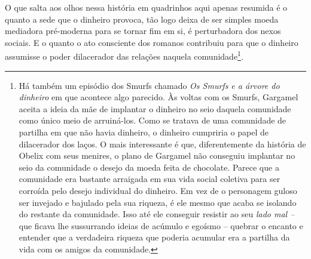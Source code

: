 O que salta aos olhos nessa história em quadrinhos aqui apenas resumida
é o quanto a sede que o dinheiro provoca, tão logo deixa de ser simples
moeda mediadora pré-moderna para se tornar fim em si, é perturbadora dos
nexos sociais. E o quanto o ato consciente dos romanos contribuiu para
que o dinheiro assumisse o poder dilacerador das relações naquela
comunidade\footnote{Há também um episódio dos Smurfs chamado \emph{Os
  Smurfs e a árvore do dinheiro} em que acontece algo parecido. Às
  voltas com os Smurfs, Gargamel aceita a ideia da mãe de implantar o
  dinheiro no seio daquela comunidade como único meio de arruiná-los.
  Como se tratava de uma comunidade de partilha em que não havia
  dinheiro, o dinheiro cumpriria o papel de dilacerador dos laços. O
  mais interessante é que, diferentemente da história de Obelix com seus
  menires, o plano de Gargamel não conseguiu implantar no seio da
  comunidade o desejo da moeda feita de chocolate. Parece que a
  comunidade era bastante arraigada em sua vida social coletiva para ser
  corroída pelo desejo individual do dinheiro. Em vez de o personagem
  guloso ser invejado e bajulado pela sua riqueza, é ele mesmo que acaba
  se isolando do restante da comunidade. Isso até ele conseguir resistir
  ao seu \emph{lado mal --} que ficava lhe sussurrando ideias de acúmulo
  e egoísmo -- quebrar o encanto e entender que a verdadeira riqueza que
  poderia acumular era a partilha da vida com os amigos da comunidade.}.

